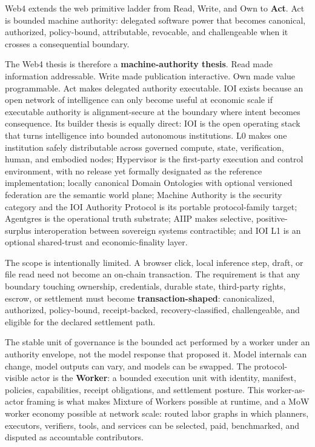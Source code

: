 \documentclass[
  11pt,
]{article}
\begin{document}
Web4 extends the web primitive ladder from Read, Write, and Own to
\textbf{Act}. Act is bounded machine authority: delegated software power
that becomes canonical, authorized, policy-bound, attributable,
revocable, and challengeable when it crosses a consequential boundary.

The Web4 thesis is therefore a \textbf{machine-authority thesis}. Read
made information addressable. Write made publication interactive. Own
made value programmable. Act makes delegated authority executable. IOI
exists because an open network of intelligence can only become useful at
economic scale if executable authority is alignment-secure at the
boundary where intent becomes consequence. Its builder thesis is equally
direct: IOI is the open operating stack that turns intelligence into bounded
autonomous institutions. L0 makes one institution safely distributable across
governed compute, state, verification, human, and embodied nodes; Hypervisor is the
first-party execution and control environment, with no release yet formally
designated as the reference implementation; locally canonical Domain
Ontologies with optional versioned federation are
the semantic world plane; Machine Authority is the security category and the
IOI Authority Protocol is its portable protocol-family target;
Agentgres is the operational truth substrate; AIIP makes selective,
positive-surplus interoperation between sovereign systems contractible; and IOI
L1 is an optional shared-trust and economic-finality layer.

The scope is intentionally limited. A browser click, local inference
step, draft, or file read need not become an on-chain transaction. The
requirement is that any boundary touching ownership, credentials,
durable state, third-party rights, escrow, or settlement must become
\textbf{transaction-shaped}: canonicalized, authorized, policy-bound,
receipt-backed, recovery-classified, challengeable, and eligible for the
declared settlement path.

The stable unit of governance is the bounded act performed by a worker
under an authority envelope, not the model response that proposed it.
Model internals can change, model outputs can vary, and models can be
swapped. The protocol-visible actor is the \textbf{Worker}: a bounded
execution unit with identity, manifest, policies, capabilities, receipt
obligations, and settlement posture. This worker-as-actor framing is
what makes Mixture of Workers possible at runtime, and a MoW worker
economy possible at network scale: routed labor graphs in which
planners, executors, verifiers, tools, and services can be selected,
paid, benchmarked, and disputed as accountable contributors.
\end{document}
